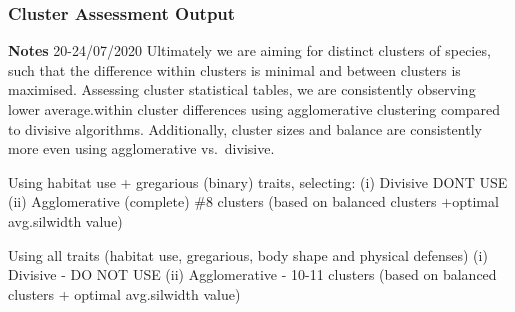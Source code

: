 \documentclass[
]{article}
\begin{document}
\hypertarget{cluster-assessment-output}{%
\subsubsection{Cluster Assessment
Output}\label{cluster-assessment-output}}

\textbf{Notes} 20-24/07/2020 Ultimately we are aiming for distinct
clusters of species, such that the difference within clusters is minimal
and between clusters is maximised. Assessing cluster statistical tables,
we are consistently observing lower average.within cluster differences
using agglomerative clustering compared to divisive algorithms.
Additionally, cluster sizes and balance are consistently more even using
agglomerative vs.~divisive.

Using habitat use + gregarious (binary) traits, selecting: (i) Divisive
DONT USE (ii) Agglomerative (complete) \#8 clusters (based on balanced
clusters +optimal avg.silwidth value)

Using all traits (habitat use, gregarious, body shape and physical
defenses) (i) Divisive - DO NOT USE (ii) Agglomerative - 10-11 clusters
(based on balanced clusters + optimal avg.silwidth value)
\end{document}
